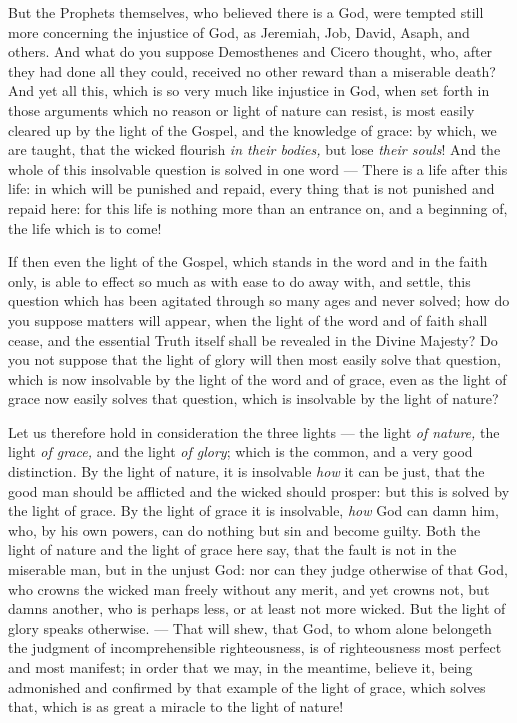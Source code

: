 But the Prophets themselves, who believed there is a God, were tempted still more concerning the injustice of God, as Jeremiah, Job, David, Asaph, and others. And what do you suppose Demosthenes and Cicero thought, who, after they had done all they could, received no other reward than a miserable death? And yet all this, which is so very much like injustice in God, when set forth in those arguments which no reason or light of nature can resist, is most easily cleared up by the light of the Gospel, and the knowledge of grace: by which, we are taught, that the wicked flourish \emph{ in their bodies, }but lose \emph{their souls}! And the whole of this insolvable question is solved in one word — There is a life after this life: in which will be punished and repaid, every thing that is not punished and repaid here: for this life is nothing more than an entrance on, and a beginning of, the life which is to come!

If then even the light of the Gospel, which stands in the word and in the faith only, is able to effect so much as with ease to do away with, and settle, this question which has been agitated through so many ages and never solved; how do you suppose matters will appear, when the light of the word and of faith shall cease, and the essential Truth itself shall be revealed in the Divine Majesty? Do you not suppose that the light of glory will then most easily solve that question, which is now insolvable by the light of the word and of grace, even as the light of grace now easily solves that question, which is insolvable by the light of nature?

Let us therefore hold in consideration the three lights — the light \emph{of nature, }the light \emph{of grace, }and the light \emph{of glory}; which is the common, and a very good distinction. By the light of nature, it is insolvable \emph{how }it can be just, that the good man should be afflicted and the wicked should prosper: but this is solved by the light of grace. By the light of grace it is insolvable, \emph{how }God can damn him, who, by his own powers, can do nothing but sin and become guilty. Both the light of nature and the light of grace here say, that the fault is not in the miserable man, but in the unjust God: nor can they judge otherwise of that God, who crowns the wicked man freely without any merit, and yet crowns not, but damns another, who is perhaps less, or at least not more wicked. But the light of glory speaks otherwise. — That will shew, that God, to whom alone belongeth the judgment of incomprehensible righteousness, is of righteousness most perfect and most manifest; in order that we may, in the meantime, believe it, being admonished and confirmed by that example of the light of grace, which solves that, which is as great a miracle to the light of nature!

